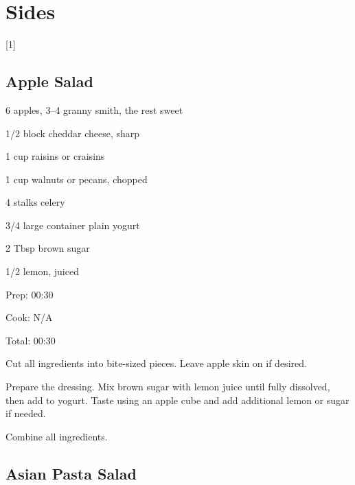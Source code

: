 \documentclass[oneside]{book}  %
\def\thisrecipe{}  %
\newcommand{\chapterrec}[1]{  %
  \newpage \def\thisrecipe{} \chapter{#1} \vspace{1.1em}
}
\newcommand{\chaptertoc}[1]{  %
  \chapterrec{#1} \vspace{-1.1em}  %
  \startcontents[chapters] \printcontents[chapters]{chapter_toc_}{1}[1]{}
}
\newcommand{\recipe}[1]{\section{#1}\def\thisrecipe{: #1}} %
\begin{document}
\chaptertoc{Sides} \label{chap:sides}
\recipe{Apple Salad} \label{recipe:apple_salad} %

\begin{IT}
  \begin{ingredients}
  \item[6] apples, 3--4 granny smith, the rest sweet
  \item[1/2 block]  cheddar cheese, sharp
  \item[1 cup] raisins or craisins
  \item[1 cup] walnuts or pecans, chopped
  \item[4 stalks] celery
  \item[3/4 large container] plain yogurt 
  \item[2 Tbsp] brown sugar
  \item[1/2] lemon, juiced
  \end{ingredients}

  \switchcolumn

  \begin{timeline}
    \item[Prep:]  00:30
    \item[Cook:]  N/A
    \item[Total:] 00:30
  \end{timeline}
\end{IT}

\begin{directions}
  \item Cut all ingredients into bite-sized pieces. Leave apple skin on if
    desired.
  \item Prepare the dressing. Mix brown sugar with lemon juice until fully
    dissolved, then add to yogurt. Taste using an apple cube and add additional
    lemon or sugar if needed.

  \columnbreak

  \item Combine all ingredients.
\end{directions}
\recipe{Asian Pasta Salad} \label{recipe:asian_pasta_salad} %
 
\end{document}

